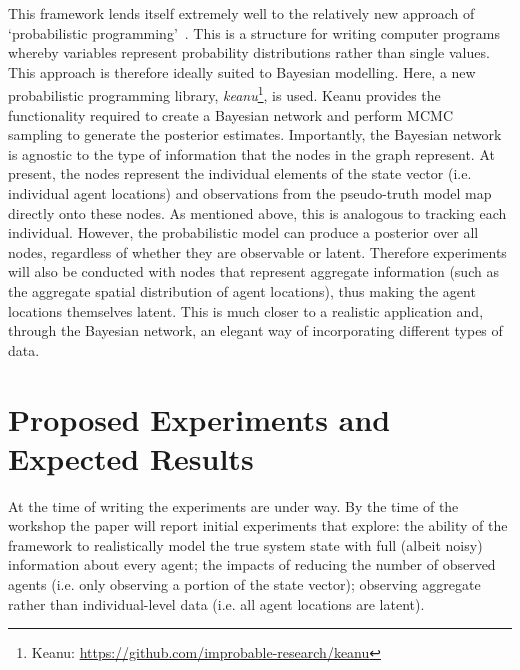 \documentclass[runningheads]{llncs}
\begin{document}
This framework lends itself extremely well to the relatively new approach of `probabilistic programming'~\cite{ghahramani_bayesian_2012,ghahramani_probabilistic_2015}. This is a structure for writing computer programs whereby variables represent probability distributions rather than single values. This approach is therefore ideally suited to Bayesian modelling. Here, a new probabilistic programming library, \textit{keanu}\footnote{Keanu: \url{https://github.com/improbable-research/keanu}}, is used. Keanu provides the functionality required to create a Bayesian network and perform MCMC sampling to generate the posterior estimates. Importantly, the Bayesian network is agnostic to the type of information that the nodes in the graph represent. At present, the nodes represent the individual elements of the state vector (i.e. individual agent locations) and observations from the pseudo-truth model map directly onto these nodes. As mentioned above, this is analogous to tracking each individual. However, the probabilistic model can produce a posterior over all nodes, regardless of whether they are observable or latent. Therefore experiments will also be conducted with nodes that represent aggregate information (such as the aggregate spatial distribution of agent locations), thus making the agent locations themselves latent. This is much closer to a realistic application and, through the Bayesian network, an elegant way of incorporating different types of data. 


\section{Proposed Experiments and Expected Results} 

At the time of writing the experiments are under way. By the time of the workshop the paper will report initial experiments that explore: the ability of the framework to realistically model the true system state with full (albeit noisy) information about every agent; the impacts of reducing the number of observed agents (i.e. only observing a portion of the state vector); observing aggregate rather than individual-level data (i.e. all agent locations are latent).




\newpage
{} %


\end{document}
